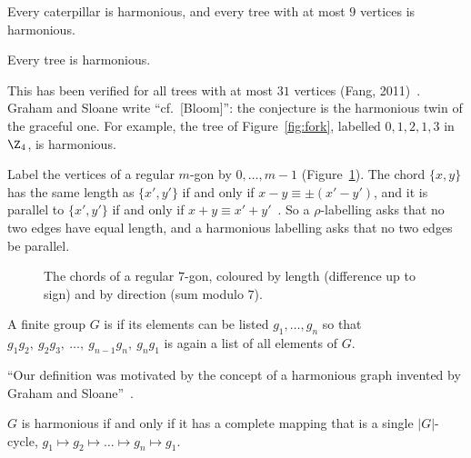\begin{theorem}\label{thm:gs-trees}
Every caterpillar is harmonious, and every tree with at most $9$ vertices is harmonious.
\end{theorem}

\begin{conjecture}\label{conj:gs}
Every tree is harmonious.
\end{conjecture}

This has been verified for all trees with at most $31$ vertices (Fang, 2011)~\cite[\S2.1]{gal25}. Graham and Sloane write ``cf.\ [Bloom]'': the conjecture is the harmonious twin of the graceful one. For example, the tree of Figure~\ref{fig:fork}, labelled $0,1,2,1,3$ in $\Z_4$, is harmonious.


Label the vertices of a regular $m$-gon by $0,\dots,m-1$ (Figure~\ref{fig:chords}). The chord $\{x,y\}$ has the same length as $\{x',y'\}$ if and only if $x-y\equiv\pm(x'-y')$, and it is parallel to $\{x',y'\}$ if and only if $x+y\equiv x'+y'$~\cite[\S3]{gs80}. So a $\rho$-labelling asks that no two edges have equal length, and a harmonious labelling asks that no two edges be parallel.

\begin{figure}[ht]
\centering

\caption{The chords of a regular $7$-gon, coloured by length (difference up to sign) and by direction (sum modulo $7$).}
\label{fig:chords}
\end{figure}


\begin{definition}\label{def:harmonious-group}
A finite group $G$ is  if its elements can be listed $g_1,\dots,g_n$ so that $g_1g_2,\ g_2g_3,\ \dots,\ g_{n-1}g_n,\ g_ng_1$ is again a list of all elements of $G$.
\end{definition}

``Our definition was motivated by the concept of a harmonious graph invented by Graham and Sloane''~\cite[\S1]{bghj91}.

\begin{fact}\label{fact:harmonious-cm}
$G$ is harmonious if and only if it has a complete mapping that is a single $|G|$-cycle, $g_1\mapsto g_2\mapsto\dots\mapsto g_n\mapsto g_1$.
\end{fact}

